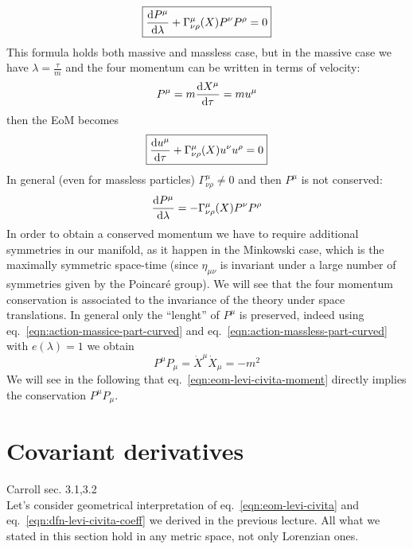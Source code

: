 \documentclass[../main/main.tex]{subfiles}
\begin{document}
\begin{equation}\label{eqn:eom-levi-civita-moment}
\boxed{
\frac{\textup{d} P^\mu}{\textup{d}\lambda}+\Gamma^\mu_{\nu\rho}(X)P^\nu P^\rho=0
}
\end{equation}
This formula holds both massive and massless case, but in the massive case we have $\lambda=\frac\tau m$  and the four momentum can be written in terms of velocity:
\[P^\mu=m\frac{\textup{d} X^\mu}{\textup{d}\tau}=m u^\mu\]
then the EoM becomes
\begin{equation}\label{eqn:eom-levi-civita-velocity}
\boxed{
\frac{\textup{d} u^\mu}{\textup{d}\tau}+\Gamma^\mu_{\nu\rho}(X)u^\nu u^\rho=0
}
\end{equation}
In general (even for massless particles) $\Gamma^\mu_{\nu\rho}\neq0$ and then $P^\mu$ is not conserved:
\[\frac{\textup{d} P^\mu}{\textup{d}\lambda}=-\Gamma^\mu_{\nu\rho}(X)P^\nu P^\rho\]
In order to obtain a conserved momentum we have to require additional symmetries in our manifold, as it happen in the Minkowski case, which is the maximally symmetric space-time (since $\eta_{\mu\nu}$ is invariant under a large number of symmetries given by the Poincaré group). 
We will see that the four momentum conservation is associated to the invariance of the theory under space translations. In general only the ``lenght'' of $P^\mu$ is preserved, indeed using eq.~\eqref{eqn:action-massice-part-curved} and eq.~\eqref{eqn:action-massless-part-curved} with $e(\lambda)=1$ we obtain
\[P^\mu P_\mu=\dot X^\mu\dot X_\mu=-m^2\]
We will see in the following that eq.~\eqref{eqn:eom-levi-civita-moment} directly implies the conservation $P^\mu P_\mu$.



\section{Covariant derivatives}
\textsf{Carroll sec. 3.1,3.2}\\

Let's consider geometrical interpretation of eq.~\eqref{eqn:eom-levi-civita} and eq.~\eqref{eqn:dfn-levi-civita-coeff}  we derived in the previous lecture. All what we stated in this section hold in any metric space, not only Lorenzian ones. 
\end{document}
